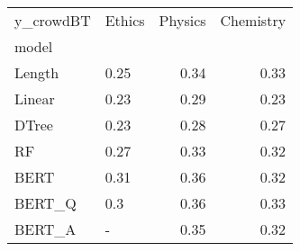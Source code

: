 \begin{tabular}{llrr}
\toprule
y\_crowdBT & Ethics &  Physics &  Chemistry \\
model  &        &          &            \\
\midrule
Length &   0.25 &     0.34 &       0.33 \\
Linear &   0.23 &     0.29 &       0.23 \\
DTree  &   0.23 &     0.28 &       0.27 \\
RF     &   0.27 &     0.33 &       0.32 \\
BERT   &   0.31 &     0.36 &       0.32 \\
BERT\_Q &    0.3 &     0.36 &       0.33 \\
BERT\_A &      - &     0.35 &       0.32 \\
\bottomrule
\end{tabular}
